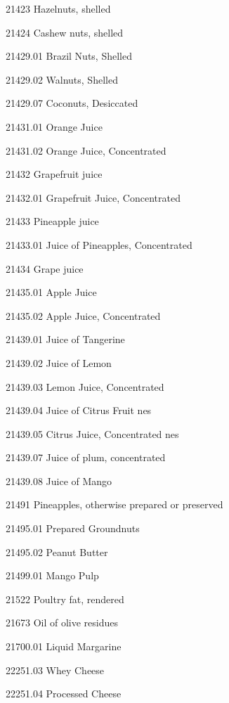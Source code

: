 \documentclass[nojss]{jss}
\begin{document}
\begin{appendices}
\begin{Schunk}
\begin{Soutput}
  21423           Hazelnuts, shelled       

  21424          Cashew nuts, shelled      

 21429.01        Brazil Nuts, Shelled      

 21429.02          Walnuts, Shelled        

 21429.07        Coconuts, Desiccated      

 21431.01            Orange Juice          

 21431.02     Orange Juice, Concentrated   

  21432            Grapefruit juice        

 21432.01   Grapefruit Juice, Concentrated 

  21433            Pineapple juice         

 21433.01        Juice of Pineapples,      
                     Concentrated          

  21434              Grape juice           

 21435.01            Apple Juice           

 21435.02     Apple Juice, Concentrated    

 21439.01         Juice of Tangerine       

 21439.02           Juice of Lemon         

 21439.03     Lemon Juice, Concentrated    

 21439.04     Juice of Citrus Fruit nes    

 21439.05   Citrus Juice, Concentrated nes 

 21439.07    Juice of plum, concentrated   

 21439.08           Juice of Mango         

  21491     Pineapples, otherwise prepared 
                     or preserved          

 21495.01        Prepared Groundnuts       

 21495.02           Peanut Butter          

 21499.01             Mango Pulp           

  21522         Poultry fat, rendered      

  21673         Oil of olive residues      

 21700.01          Liquid Margarine        

 22251.03            Whey Cheese           

 22251.04          Processed Cheese        


\end{Soutput}
\end{Schunk}
\end{appendices}
\end{document}
